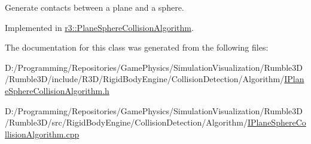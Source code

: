 Generate contacts between a plane and a sphere. 



Implemented in \mbox{\hyperlink{classr3_1_1_plane_sphere_collision_algorithm_a6823dc80b23ce77beabd26a9c2a9d9ed}{r3\+::\+Plane\+Sphere\+Collision\+Algorithm}}.



The documentation for this class was generated from the following files\+:\begin{DoxyCompactItemize}
\item 
D\+:/\+Programming/\+Repositories/\+Game\+Physics/\+Simulation\+Visualization/\+Rumble3\+D/\+Rumble3\+D/include/\+R3\+D/\+Rigid\+Body\+Engine/\+Collision\+Detection/\+Algorithm/\mbox{\hyperlink{_i_plane_sphere_collision_algorithm_8h}{I\+Plane\+Sphere\+Collision\+Algorithm.\+h}}\item 
D\+:/\+Programming/\+Repositories/\+Game\+Physics/\+Simulation\+Visualization/\+Rumble3\+D/\+Rumble3\+D/src/\+Rigid\+Body\+Engine/\+Collision\+Detection/\+Algorithm/\mbox{\hyperlink{_i_plane_sphere_collision_algorithm_8cpp}{I\+Plane\+Sphere\+Collision\+Algorithm.\+cpp}}\end{DoxyCompactItemize}
